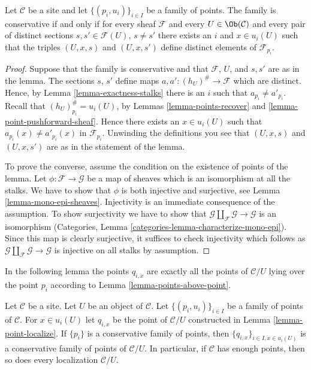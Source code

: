 \begin{lemma}
\label{lemma-enough}
Let $\mathcal{C}$ be a site and let $\{(p_i, u_i)\}_{i\in I}$ be a
family of points. The family is conservative if and only if for every
sheaf $\mathcal{F}$ and every $U\in \Ob(\mathcal{C})$ and every
pair of distinct sections $s, s' \in \mathcal{F}(U)$, $s \not = s'$ there
exists an $i$ and $x\in u_i(U)$ such that the triples
$(U, x, s)$ and $(U, x, s')$ define distinct elements of
$\mathcal{F}_{p_i}$.
\end{lemma}

\begin{proof}
Suppose that the family is conservative and that $\mathcal{F}$, $U$, and
$s, s'$ are as in the lemma. The sections $s$, $s'$ define maps
$a, a' : (h_U)^\# \to \mathcal{F}$ which are distinct. Hence, by Lemma
\ref{lemma-exactness-stalks} there is an $i$ such that $a_{p_i}
\not = a'_{p_i}$. Recall that $(h_U)^\#_{p_i} = u_i(U)$, by
Lemmas \ref{lemma-points-recover} and
\ref{lemma-point-pushforward-sheaf}.
Hence there exists an $x \in u_i(U)$ such that $a_{p_i}(x)
\not = a'_{p_i}(x)$ in $\mathcal{F}_{p_i}$.
Unwinding the definitions you see that $(U, x, s)$
and $(U, x, s')$ are as in the statement of the lemma.

\medskip\noindent
To prove the converse, assume the condition on the existence of
points of the lemma. Let $\phi : \mathcal{F} \to \mathcal{G}$
be a map of sheaves which is an isomorphism at all the stalks.
We have to show that $\phi$ is both
injective and surjective, see Lemma \ref{lemma-mono-epi-sheaves}.
Injectivity is an immediate consequence of the assumption.
To show surjectivity we have to show that
$\mathcal{G} \amalg_\mathcal{F} \mathcal{G} \to \mathcal{G}$
is an isomorphism
(Categories, Lemma \ref{categories-lemma-characterize-mono-epi}).
Since this map is clearly surjective, it suffices to check injectivity
which follows as $\mathcal{G} \amalg_\mathcal{F} \mathcal{G} \to \mathcal{G}$
is injective on all stalks by assumption.
\end{proof}

\noindent
In the following lemma the points $q_{i, x}$ are exactly all the points
of $\mathcal{C}/U$ lying over the point $p_i$ according to
Lemma \ref{lemma-points-above-point}.

\begin{lemma}
\label{lemma-localize-enough}
Let $\mathcal{C}$ be a site. Let $U$ be an object of $\mathcal{C}$.
Let $\{(p_i, u_i)\}_{i\in I}$ be a family of points of $\mathcal{C}$.
For $x \in u_i(U)$ let $q_{i, x}$ be the point of $\mathcal{C}/U$
constructed in
Lemma \ref{lemma-point-localize}.
If $\{p_i\}$ is a conservative family of points, then
$\{q_{i, x}\}_{i \in I, x \in u_i(U)}$ is a conservative
family of points of $\mathcal{C}/U$.
In particular, if $\mathcal{C}$ has enough points, then so
does every localization $\mathcal{C}/U$.
\end{lemma}

